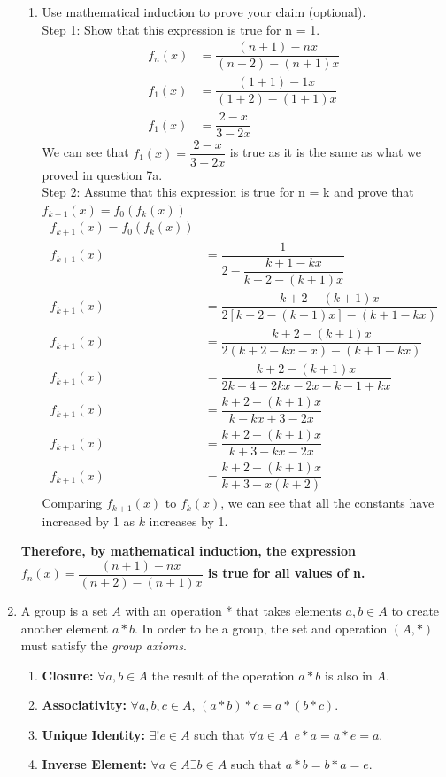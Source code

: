 \documentclass[12pt]{book}
\begin{document}
\begin{enumerate}
\begin{enumerate}
\item Use mathematical induction to prove your claim (optional).\\

Step 1: Show that this expression is true for n = 1.
\setcounter{equation}{0}
\begin{align*}
    f_n(x) &= \dfrac{(n+1) - nx}{(n+2) - (n+1)x} \\
    f_1(x) &= \dfrac{(1+1) - 1x}{(1+2) - (1+1)x} \\
    f_1(x) &= \dfrac{2 - x}{3 - 2x}
\end{align*}
We can see that $f_1(x) = \dfrac{2 - x}{3 - 2x}$ is true as it is the same as what we proved in question 7a.\\

Step 2: Assume that this expression is true for n = k and prove that $f_{k+1}(x) = f_0(f_k(x))$
\setcounter{equation}{0}
\begin{align*}
    f_{k+1}(x) = f_0(f_k(x)) \\
    f_{k+1}(x) &= \dfrac{1}{2-\dfrac{k+1-kx}{k+2-(k+1)x}} \\
    f_{k+1}(x) &= \dfrac{k+2 - (k+1)x}{2[k+2-(k+1)x] - (k+1 - kx)} \\
    f_{k+1}(x) &= \dfrac{k+2 - (k+1)x}{2(k+2-kx-x)-(k+1-kx)} \\
    f_{k+1}(x) &= \dfrac{k+2 - (k+1)x}{2k+4-2kx-2x-k-1+kx} \\
    f_{k+1}(x) &= \dfrac{k+2 - (k+1)x}{k-kx+3-2x} \\
    f_{k+1}(x) &= \dfrac{k+2 - (k+1)x}{k+3-kx-2x} \\
    f_{k+1}(x) &= \dfrac{k+2 - (k+1)x}{k+3-x(k+2)}
\end{align*}
Comparing $f_{k+1}(x)$ to $f_{k}(x)$, we can see that all the constants have increased by 1 as $k$ increases by 1.
\end{enumerate}
\endgroup

\textbf{Therefore, by mathematical induction, the expression $f_n(x) = \dfrac{(n+1) - nx}{(n+2) - (n+1)x}$ is true for all values of n.}

\newpage

\item A group is a set $A$ with an operation * that takes elements $a,b \in A$ to create another element $a*b$. In order to be a group, the set and operation $(A,*)$ must satisfy the \emph{group axioms}. 


\begin{enumerate}
\item \textbf{Closure: } $\forall a,b \in A$ the result of the operation $a*b$ is also in $A$.
\item \textbf{Associativity: } $\forall a,b,c \in A$, $(a*b)*c = a*(b*c)$.
\item \textbf{Unique Identity: } $\exists! e \in A$ such that $\forall  a \in A \, \, \, e*a = a*e = a$. 
\item \textbf{Inverse Element: } $\forall a \in A \exists b \in A$ such that $a*b = b*a = e$. 
\end{enumerate}


\end{enumerate}
\end{document}

